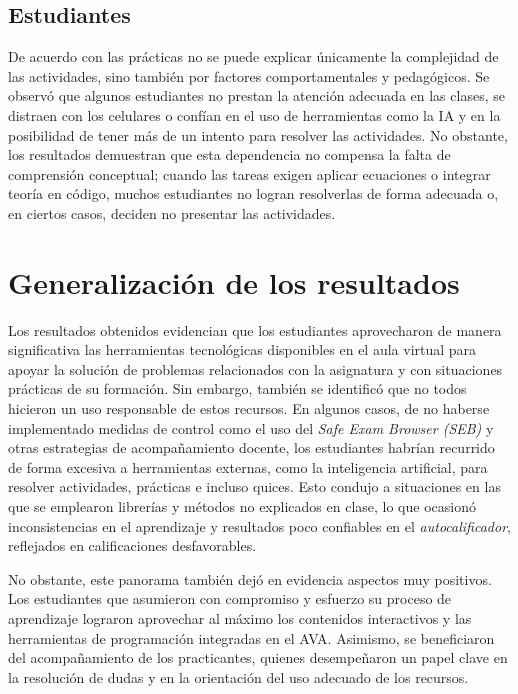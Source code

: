 \documentclass[letter,oneside,12pt,spanish]{report}
\begin{document}
\subsection{Estudiantes}

De acuerdo con las prácticas no se puede explicar únicamente la complejidad de las actividades, sino también por factores comportamentales y pedagógicos. Se observó que algunos estudiantes no prestan la atención adecuada en las clases, se distraen con los celulares o confían en el uso de herramientas como la IA y en la posibilidad de tener más de un intento para resolver las actividades. No obstante, los resultados demuestran que esta dependencia no compensa la falta de comprensión conceptual; cuando las tareas exigen aplicar ecuaciones o integrar teoría en código, muchos estudiantes no logran resolverlas de forma adecuada o, en ciertos casos, deciden no presentar las actividades.



\section{Generalización de los resultados}

Los resultados obtenidos evidencian que los estudiantes aprovecharon de manera significativa las herramientas tecnológicas disponibles en el aula virtual para apoyar la solución de problemas relacionados con la asignatura y con situaciones prácticas de su formación. Sin embargo, también se identificó que no todos hicieron un uso responsable de estos recursos. En algunos casos, de no haberse implementado medidas de control como el uso del \textit{Safe Exam Browser (SEB)} y otras estrategias de acompañamiento docente, los estudiantes habrían recurrido de forma excesiva a herramientas externas, como la inteligencia artificial, para resolver actividades, prácticas e incluso quices. Esto condujo a situaciones en las que se emplearon librerías y métodos no explicados en clase, lo que ocasionó inconsistencias en el aprendizaje y resultados poco confiables en el \textit{autocalificador}, reflejados en calificaciones desfavorables.

No obstante, este panorama también dejó en evidencia aspectos muy positivos. Los estudiantes que asumieron con compromiso y esfuerzo su proceso de aprendizaje lograron aprovechar al máximo los contenidos interactivos y las herramientas de programación integradas en el AVA. Asimismo, se beneficiaron del acompañamiento de los practicantes, quienes desempeñaron un papel clave en la resolución de dudas y en la orientación del uso adecuado de los recursos.
\end{document}
